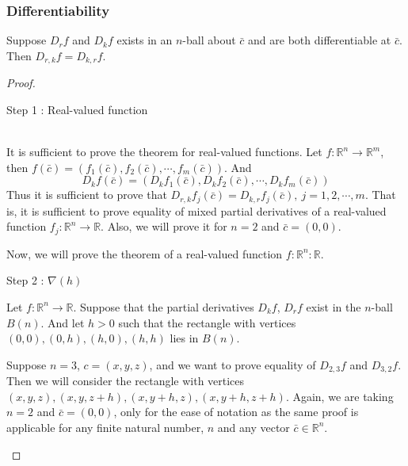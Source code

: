 \subsubsection{Differentiability}
\begin{theorem}
Suppose $D_r f$ and $D_k f$ exists in an $n$-ball about $\bar{c}$ and are both differentiable at $\bar{c}$.
Then $D_{r,k} f = D_{k,r} f$.
\end{theorem}
\begin{proof}
\begin{commentary}Step 1 : Real-valued function\end{commentary}\\
	It is sufficient to prove the theorem for real-valued functions.
	Let $f : \mathbb{R}^n \to \mathbb{R}^m$, then $f(\bar{c}) = \left( f_1(\bar{c}),f_2(\bar{c}),\cdots,f_m(\bar{c}) \right)$.
	And
	\[ D_k f(\bar{c}) = \left( D_k f_1(\bar{c}), D_k f_2(\bar{c}), \cdots, D_k f_m(\bar{c}) \right) \]
	Thus it is sufficient to prove that $D_{r,k}f_j(\bar{c}) = D_{k,r}f_j(\bar{c}),\ j = 1,2,\cdots,m$.
	That is, it is sufficient to prove equality of mixed partial derivatives of a real-valued function $f_j : \mathbb{R}^n \to \mathbb{R}$.
	Also, we will prove it for $n = 2$ and $\bar{c} = (0,0)$.
\begin{commentary}
	Now, we will prove the theorem of a real-valued function $f : \mathbb{R}^n : \mathbb{R}$.\\
\end{commentary}
\begin{commentary}Step 2 : $\nabla(h)$\end{commentary}

Let $f : \mathbb{R}^n \to \mathbb{R}$.
Suppose that the partial derivatives $D_k f$, $D_r f$ exist in the $n$-ball $B(n)$.
And let $h > 0$ such that the rectangle with vertices $(0,0), (0,h), (h,0), (h,h)$ lies in $B(n)$.

\begin{commentary} Suppose $n=3$, $c = (x,y,z)$, and we want to prove equality of $D_{2,3} f$ and $D_{3,2} f$.
Then we will consider the rectangle with vertices $(x,y,z), (x,y,z+h), (x,y+h,z), (x,y+h,z+h)$.
Again, we are taking $n=2$ and $\bar{c} = (0,0)$, only for the ease of notation as the same proof is applicable for any finite natural number, $n$ and any vector $\bar{c} \in \mathbb{R}^n$.\end{commentary}


\end{proof}
